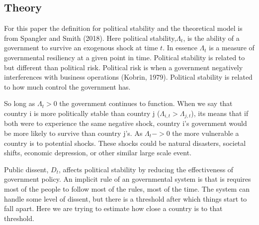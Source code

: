 \documentclass[12pt]{article}
\begin{document}
\begin{spacing}{1.5}
  
\section*{Theory}

For this paper the definition for political stability and the theoretical model is from Spangler and Smith (2018). Here political stability,$\Lambda_t$, is the ability of a government to survive an exogenous shock at time $t$. In essence $\Lambda_t$ is a measure of governmental resiliency at a given point in time. Political stability is related to but different than political risk. Political risk is when a government negatively interferences with business operations (Kobrin, 1979). Political stability is related to how much control the government has.  

So long as $\Lambda_t>0$ the government continues to function. When we say that country i is more politically stable than country j ($\Lambda_{i,t} > \Lambda_{j,t}$), its means that if both were to experience the same negative shock, country i's government would be more likely to survive than country j's. As $\Lambda_t->0$ the more vulnerable a country is to potential shocks. These shocks could be natural disasters, societal shifts, economic depression, or other similar large scale event. 

Public dissent, $D_t$, affects political stability by reducing the effectiveness of government policy. An implicit rule of an governmental system is that is requires most of the people to follow most of the rules, most of the time. The system can handle some level of dissent, but there is a threshold after which things start to fall apart. Here we are trying to estimate how close a country is to that threshold.   
 







\end{spacing}
\end{document}
